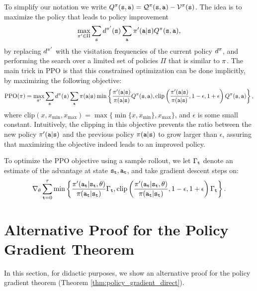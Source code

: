 To simplify our notation we write $Q^{\pi}({\tt s},{\tt a}) = \mathcal{Q}^{\pi}({\tt s},{\tt a}) - \mathcal{V}^{\pi}({\tt s})$. The idea is to maximize the policy that leads to policy improvement
\begin{equation*}
    \max_{\pi'\in \Pi}\sum_{{\tt s}} d^{\pi'}({\tt s}) \sum_{\tt a} \pi'({\tt a}|{\tt s})Q^{\pi}({\tt s},{\tt a}),
\end{equation*}
by replacing $d^{\pi'}$ with the visitation frequencies of the current policy $d^{\pi}$, and performing the search over a limited set of policies $\Pi$ that is similar to $\pi$. The main trick in PPO is that this constrained optimization can be done implicitly, by maximizing the following objective:
\begin{equation}\label{eq:PPO}
    \textrm{PPO}(\pi) = \max_{\pi'}\sum_{{\tt s}} d^{\pi}({\tt s}) \sum_{\tt a} \pi({\tt a}|{\tt s}) \min \left\{\frac{\pi'({\tt a}|{\tt s})}{\pi({\tt a}|{\tt s})}Q^{\pi}({\tt s},{\tt a}),  \textrm{clip}\left(\frac{\pi'({\tt a}|{\tt s})}{\pi({\tt a}|{\tt s})} , 1-\epsilon, 1+\epsilon\right)Q^{\pi}({\tt s},{\tt a}) \right\},
\end{equation}
where $\textrm{clip}\left(x , x_{\min}, x_{\max}\right) = \max\{\min\{x, x_{\min}\}, x_{\max}\}$, and $\epsilon$ is some small constant. Intuitively, the clipping in this objective prevents the ratio between the new policy $\pi'({\tt a}|{\tt s})$ and the previous policy $\pi({\tt a}|{\tt s})$ to grow larger than $\epsilon$, assuring that maximizing the objective indeed leads to an improved policy.

To optimize the PPO objective using a sample rollout, we let $\Gamma_{\tt t}$ denote an estimate of the advantage at state ${\tt s}_{\tt t}, {\tt a}_{\tt t}$, and take gradient descent steps on:
\begin{equation*}
    \nabla_{\theta}\sum_{{\tt t}=0}^\tau \min \left\{\frac{\pi'({\tt a}_{\tt t}|{\tt s}_{\tt t}, \theta)}{\pi({\tt a}_{\tt t}|{\tt s}_{\tt t})}\Gamma_{\tt t},  \textrm{clip}\left(\frac{\pi'({\tt a}_{\tt t}|{\tt s}_{\tt t}, \theta)}{\pi({\tt a}_{\tt t}|{\tt s}_{\tt t})} , 1-\epsilon, 1+\epsilon\right)\Gamma_{\tt t} \right\}.
\end{equation*}

\section{Alternative Proof for the Policy Gradient Theorem}
In this section, for didactic purposes, we show an alternative proof for the policy gradient theorem (Theorem \ref{thm:policy_gradient_direct}). 

